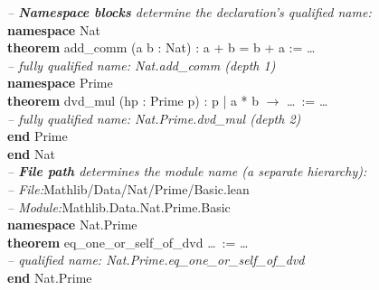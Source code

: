 \begin{codebox}
\textit{\color{gray}-- \textbf{Namespace blocks} determine the declaration's qualified name:}\\
\textbf{namespace} \textcolor{green!50!black}{Nat}\\
\hspace{1.5em}\textbf{theorem} \textcolor{red!70!black}{add\_comm} (a b : Nat) : a + b = b + a := \ldots\\
\hspace{1.5em}\textit{\color{gray}-- fully qualified name: \textcolor{red!70!black}{Nat.add\_comm} \quad(depth 1)}\\[3pt]
\hspace{1.5em}\textbf{namespace} \textcolor{green!50!black}{Prime}\\
\hspace{3em}\textbf{theorem} \textcolor{red!70!black}{dvd\_mul} (hp : Prime p) : p | a * b $\to$ \ldots\ := \ldots\\
\hspace{3em}\textit{\color{gray}-- fully qualified name: \textcolor{red!70!black}{Nat.Prime.dvd\_mul} \quad(depth 2)}\\
\hspace{1.5em}\textbf{end} \textcolor{green!50!black}{Prime}\\
\textbf{end} \textcolor{green!50!black}{Nat}\\[6pt]
\textit{\color{gray}-- \textbf{File path} determines the module name (a separate hierarchy):}\\
\textit{\color{gray}-- File:}\quad \textcolor{blue!60!black}{Mathlib/Data/Nat/Prime/Basic.lean}\\
\textit{\color{gray}-- Module:}\quad \textcolor{blue!60!black}{Mathlib.Data.Nat.Prime.Basic}\\[3pt]
\textbf{namespace} \textcolor{green!50!black}{Nat.Prime}\\
\hspace{1.5em}\textbf{theorem} \textcolor{red!70!black}{eq\_one\_or\_self\_of\_dvd} \ldots\ := \ldots\\
\hspace{1.5em}\textit{\color{gray}-- qualified name: \textcolor{red!70!black}{Nat.Prime.eq\_one\_or\_self\_of\_dvd}}\\
\textbf{end} \textcolor{green!50!black}{Nat.Prime}
\end{codebox}

